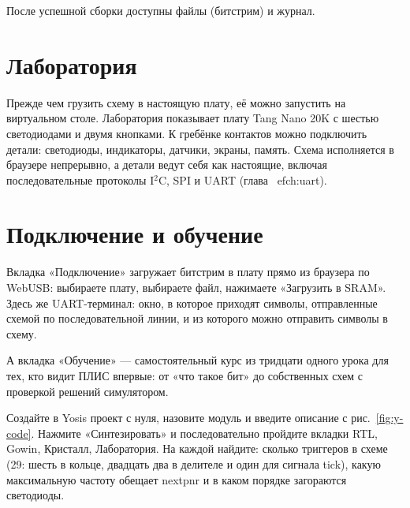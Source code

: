 
После успешной сборки доступны файлы  (битстрим) и журнал.

\section{Лаборатория}

Прежде чем грузить схему в настоящую плату, её можно запустить на
виртуальном столе. Лаборатория показывает плату Tang Nano 20K с шестью
светодиодами и двумя кнопками. К гребёнке контактов можно подключить детали:
светодиоды, индикаторы, датчики, экраны, память. Схема исполняется в браузере
непрерывно, а детали ведут себя как настоящие, включая последовательные протоколы I$^2$C, SPI
и UART (глава~
ef{ch:uart}).


\section{Подключение и обучение}

Вкладка «Подключение» загружает битстрим в плату прямо из браузера по
WebUSB: выбираете плату, выбираете файл, нажимаете «Загрузить в SRAM». Здесь
же UART-терминал: окно, в которое приходят символы, отправленные схемой
по последовательной линии, и из которого можно отправить символы в схему.


А вкладка «Обучение» --- самостоятельный курс из тридцати одного урока для
тех, кто видит ПЛИС впервые: от «что такое бит» до собственных схем с
проверкой решений симулятором.


\begin{taskbox}[Задание]
Создайте в Yosis проект с нуля, назовите модуль  и введите
описание с рис.~\ref{fig:y-code}. Нажмите «Синтезировать» и последовательно
пройдите вкладки RTL, Gowin, Кристалл, Лаборатория. На каждой найдите:
сколько триггеров в схеме (29: шесть в кольце, двадцать два в делителе и один для сигнала tick),
какую максимальную частоту обещает nextpnr и в каком порядке загораются
светодиоды.
\end{taskbox}
